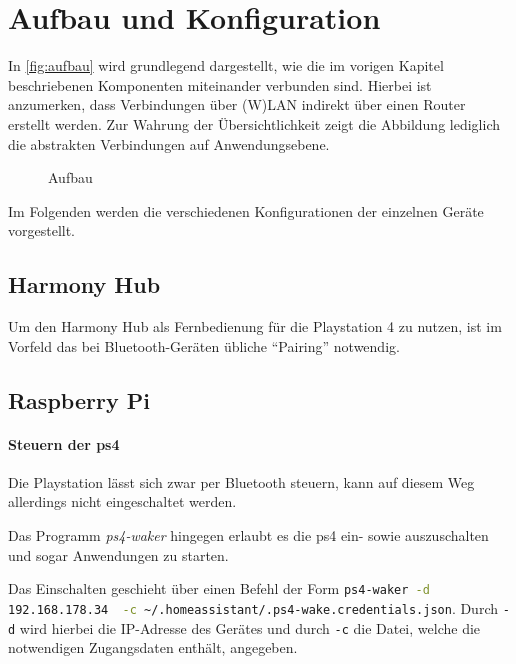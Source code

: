 \newpage
\section{Aufbau und Konfiguration}\label{sec:aufbau}
In \autoref{fig:aufbau} wird grundlegend dargestellt,
wie die im vorigen Kapitel beschriebenen Komponenten miteinander verbunden sind.
Hierbei ist anzumerken, dass Verbindungen über (W)LAN indirekt über einen Router erstellt werden.
Zur Wahrung der Übersichtlichkeit zeigt die Abbildung
 lediglich die abstrakten Verbindungen auf Anwendungsebene.

\begin{figure}[ht!]
    \centering
    \resizebox{\textwidth}{!}{
        
    }
    \caption{Aufbau}
    \label{fig:aufbau}
\end{figure}

Im Folgenden werden die verschiedenen Konfigurationen der einzelnen Geräte vorgestellt.

\subsection{Harmony Hub}\label{sec:aufbau-hub}
Um den Harmony Hub als Fernbedienung für die Playstation 4 zu nutzen,
ist im Vorfeld das bei Bluetooth-Geräten übliche \enquote{Pairing} notwendig.

\newpage

\subsection{Raspberry Pi}\label{sec:aufbau-hassbian}

\paragraph{Steuern der \ac{ps4}}
Die Playstation lässt sich zwar per Bluetooth steuern,
kann auf diesem Weg allerdings nicht eingeschaltet werden.

Das Programm \textit{ps4-waker} hingegen erlaubt es die \ac{ps4} ein- sowie auszuschalten und sogar Anwendungen zu starten.

Das Einschalten geschieht über einen Befehl der Form \lstinline[language=bash]{ps4-waker -d 192.168.178.34  -c ~/.homeassistant/.ps4-wake.credentials.json}.
Durch \lstinline[language=bash]{-d} wird hierbei die IP-Adresse des Gerätes und
durch \lstinline[language=bash]{-c} die Datei,
welche die notwendigen Zugangsdaten enthält, angegeben.

